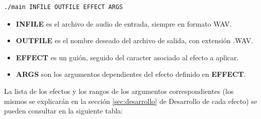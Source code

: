 \documentclass[a4paper,spanish,12pt]{article}
\begin{document}
\lstset{language=bash}
\begin{lstlisting}[frame=single]
./main INFILE OUTFILE EFFECT ARGS
\end{lstlisting}

\begin{itemize}
 \item \textbf{INFILE} es el archivo de audio de entrada, siempre en formato WAV.
 \item \textbf{OUTFILE} es el nombre deseado del archivo de salida, con extensión .WAV.
 \item \textbf{EFFECT} es un guión, seguido del caracter asociado al efecto a aplicar.
 \item \textbf{ARGS} son los argumentos dependientes del efecto definido en \textbf{EFFECT}.
\end{itemize}

La lista de los efectos y los rangos de los argumentos correspondientes (los mismos se explicarán en la sección \ref{sec:desarrollo} de Desarrollo de cada efecto) se pueden consultar en la siguiente tabla:\vspace{\baselineskip}
\end{document}
